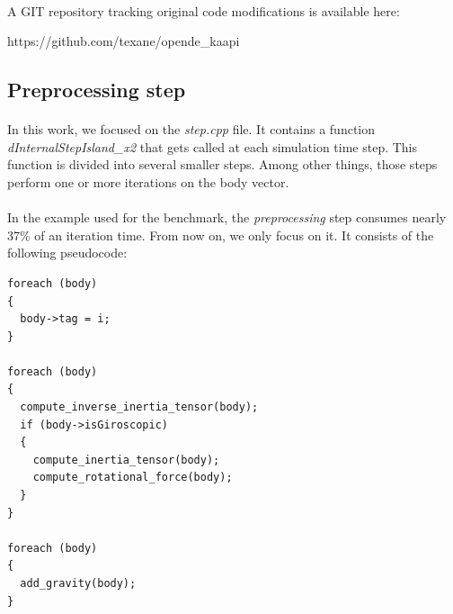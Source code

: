 \documentclass[a4paper, 11pt]{article}
\begin{document}
\paragraph{}
A GIT repository tracking original code modifications is available here:
\begin{center}
  https://github.com/texane/opende\_kaapi
\end{center}

%
%

\subsection{Preprocessing step}
\paragraph{}
In this work, we focused on the \textit{step.cpp} file. It contains a function
\textit{dInternalStepIsland\_x2} that gets called at each simulation time step.
This function is divided into several smaller steps. Among other things, those
steps perform one or more iterations on the body vector.
\paragraph{}
In the example used for the benchmark, the \textit{preprocessing} step consumes
nearly 37\% of an iteration time. From now on, we only focus on it. It consists
of the following pseudocode:
\pagebreak
\begin{small}
\lstset{language=C}
\begin{lstlisting}[frame=tb]
foreach (body)
{
  body->tag = i;
}

foreach (body)
{
  compute_inverse_inertia_tensor(body);
  if (body->isGiroscopic)
  {
    compute_inertia_tensor(body);
    compute_rotational_force(body);
  }
}

foreach (body)
{
  add_gravity(body);
}
\end{lstlisting}
\end{small}
\end{document}
